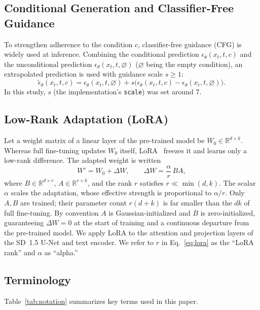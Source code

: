 \documentclass[10pt,twocolumn]{article}
\begin{document}
\subsection{Conditional Generation and Classifier-Free Guidance}
To strengthen adherence to the condition $c$, classifier-free guidance (CFG) is widely used at inference. Combining the conditional prediction $\epsilon_\theta(x_t,t,c)$ and the unconditional prediction $\epsilon_\theta(x_t,t,\varnothing)$ ($\varnothing$ being the empty condition), an extrapolated prediction is used with guidance scale $s\ge 1$:
\begin{equation}
\tilde\epsilon_\theta(x_t,t,c)=\epsilon_\theta(x_t,t,\varnothing)+s\big(\epsilon_\theta(x_t,t,c)-\epsilon_\theta(x_t,t,\varnothing)\big).
\end{equation}
In this study, $s$ (the implementation's \texttt{scale}) was set around $7$.

\subsection{Low-Rank Adaptation (LoRA)}
Let a weight matrix of a linear layer of the pre-trained model be $W_0\in\mathbb{R}^{d\times k}$. Whereas full fine-tuning updates $W_0$ itself, LoRA~\cite{hu2022lora} freezes it and learns only a low-rank difference. The adapted weight is written
\begin{equation}
W' = W_0 + \Delta W,\qquad \Delta W=\frac{\alpha}{r}\,B A,
\label{eq:lora}
\end{equation}
where $B\in\mathbb{R}^{d\times r}$, $A\in\mathbb{R}^{r\times k}$, and the rank $r$ satisfies $r\ll\min(d,k)$. The scalar $\alpha$ scales the adaptation, whose effective strength is proportional to $\alpha/r$. Only $A,B$ are trained; their parameter count $r(d+k)$ is far smaller than the $dk$ of full fine-tuning. By convention $A$ is Gaussian-initialized and $B$ is zero-initialized, guaranteeing $\Delta W=0$ at the start of training and a continuous departure from the pre-trained model. We apply LoRA to the attention and projection layers of the SD~1.5 U-Net and text encoder. We refer to $r$ in Eq.~\eqref{eq:lora} as the ``LoRA rank'' and $\alpha$ as ``alpha.''

\subsection{Terminology}
Table~\ref{tab:notation} summarizes key terms used in this paper.
\end{document}
